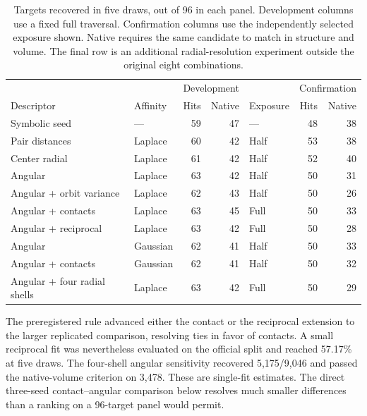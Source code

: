 \begin{table}[tbp]\centering\small\setlength{\tabcolsep}{4pt}
\caption{Targets recovered in five draws, out of 96 in each panel. Development columns use a fixed full traversal. Confirmation columns use the independently selected exposure shown. Native requires the same candidate to match in structure and volume. The final row is an additional radial-resolution experiment outside the original eight combinations.}\label{tab:kernel-all}
\begin{tabular}{llrrlrr}\hline
& & \multicolumn{2}{c}{Development} & & \multicolumn{2}{c}{Confirmation}\\
Descriptor & Affinity & Hits & Native & Exposure & Hits & Native\\\hline
Symbolic seed & --- & 59 & 47 & --- & 48 & 38\\
Pair distances & Laplace & 60 & 42 & Half & 53 & 38\\
Center radial & Laplace & 61 & 42 & Half & 52 & 40\\
Angular & Laplace & 63 & 42 & Half & 50 & 31\\
Angular + orbit variance & Laplace & 62 & 43 & Half & 50 & 26\\
Angular + contacts & Laplace & 63 & 45 & Full & 50 & 33\\
Angular + reciprocal & Laplace & 63 & 42 & Full & 50 & 28\\
Angular & Gaussian & 62 & 41 & Half & 50 & 33\\
Angular + contacts & Gaussian & 62 & 41 & Half & 50 & 32\\\hline
Angular + four radial shells & Laplace & 63 & 42 & Full & 50 & 29\\\hline
\end{tabular}
\end{table}

The preregistered rule advanced either the contact or the reciprocal extension to the larger replicated comparison, resolving ties in favor of contacts. A small reciprocal fit was nevertheless evaluated on the official split and reached 57.17\% at five draws. The four-shell angular sensitivity recovered 5,175/9,046 and passed the native-volume criterion on 3,478. These are single-fit estimates. The direct three-seed contact--angular comparison below resolves much smaller differences than a ranking on a 96-target panel would permit.

